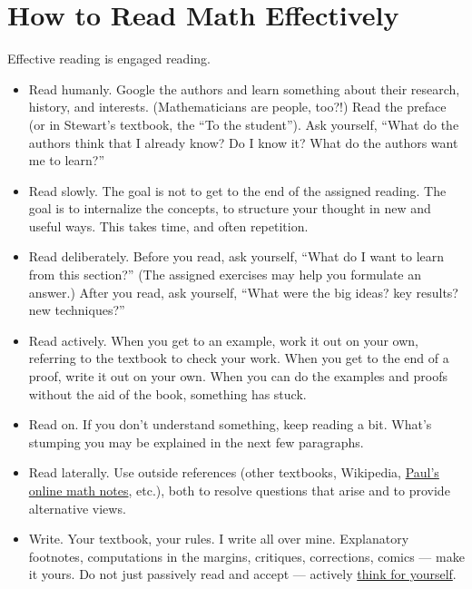 \section{How to Read Math Effectively}

Effective reading is engaged reading.
\begin{itemize}
\item Read humanly. Google the authors and learn something about their research, history, and interests. (Mathematicians are people, too?!) Read the preface (or in Stewart's textbook, the ``To the student''). Ask yourself, ``What do the authors think that I already know? Do I know it? What do the authors want me to learn?''
\item Read slowly. The goal is not to get to the end of the assigned reading. The goal is to internalize the concepts, to structure your thought in new and useful ways. This takes time, and often repetition.
\item Read deliberately. Before you read, ask yourself, ``What do I want to learn from this section?'' (The assigned exercises may help you formulate an answer.) After you read, ask yourself, ``What were the big ideas? key results? new techniques?''
\item Read actively. When you get to an example, work it out on your own, referring to the textbook to check your work. When you get to the end of a proof, write it out on your own. When you can do the examples and proofs without the aid of the book, something has stuck.
\item Read on. If you don't understand something, keep reading a bit. What's stumping you may be explained in the next few paragraphs.
\item Read laterally. Use outside references (other textbooks, Wikipedia, \href{http://tutorial.math.lamar.edu/}{Paul's online math notes}, etc.), both to resolve questions that arise and to provide alternative views.
\item Write. Your textbook, your rules. I write all over mine. Explanatory footnotes, computations in the margins, critiques, corrections, comics --- make it yours. %
Do not just passively read and accept --- actively \href{https://www.youtube.com/watch?v=tpeLSMKNFO4}{think for yourself}.
\end{itemize}